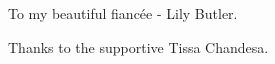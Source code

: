 \cleardoublepage


\begin{acknowledgements}

To my beautiful fiancée - Lily Butler.

Thanks to the supportive Tissa Chandesa.

\end{acknowledgements}